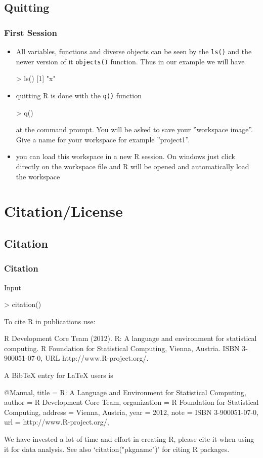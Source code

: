\documentclass[xcolor={table},c]{beamer}
\begin{document}
\subsection{Quitting}
\begin{frame}[fragile]\frametitle{First Session}
\begin{itemize}
\item All variables, functions and diverse objects can be seen by the \texttt{ls()} and the newer version of it \texttt{objects()} function. Thus in our example we will have
\begin{semiverbatim}
> ls()
[1] "x"
\end{semiverbatim}
\item quitting R is done with the  \texttt{q()} function
\begin{semiverbatim}
> q()
\end{semiverbatim}
at the command prompt. You will be asked to save your ''workspace image''. Give a name for your workspace for example ''project1''.

\item you can load this workspace in a new R session. On windows just click directly on the workspace file and R will be opened and automatically load the workspace
\end{itemize}
\end{frame}



\section{Citation/License}
\subsection{Citation}
\begin{frame}[shrink=11,fragile,c]\frametitle{Citation}
  \begin{block}{Input}
\begin{semiverbatim}
> citation()
\end{semiverbatim}
  \end{block}
\begin{semiverbatim}
To cite R in publications use:

  R Development Core Team (2012). R: A language and environment for
  statistical computing. R Foundation for Statistical Computing,
  Vienna, Austria. ISBN 3-900051-07-0, URL http://www.R-project.org/.

A BibTeX entry for LaTeX users is

  @Manual{,
    title = {R: A Language and Environment for Statistical Computing},
    author = {{R Development Core Team}},
    organization = {R Foundation for Statistical Computing},
    address = {Vienna, Austria},
    year = {2012},
    note = {{ISBN} 3-900051-07-0},
    url = {http://www.R-project.org/},
  }

We have invested a lot of time and effort in creating R, please cite it
when using it for data analysis. See also ‘citation("pkgname")’ for
citing R packages.

\end{semiverbatim}
\end{frame}
\end{document}
